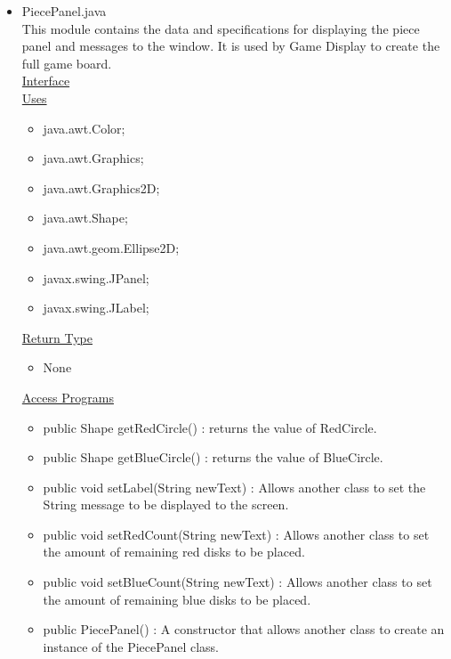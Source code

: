 \documentclass[12pt]{article}
\begin{document}
\begin{itemize}
\begin{itemize}
		\end{itemize}
			\item PiecePanel.java \\
			This module contains the data and specifications for displaying the piece panel and messages to the window. It is used by Game Display to create the full game board. \\
			\underline{Interface} \\
			\underline{Uses}
			\begin{itemize}
				\item java.awt.Color;
				\item java.awt.Graphics;
				\item java.awt.Graphics2D;
				\item java.awt.Shape; 
				\item java.awt.geom.Ellipse2D;
				\item javax.swing.JPanel;
				\item javax.swing.JLabel;
			\end{itemize} 
			\underline{Return Type}
			\begin{itemize}
				\item None
			\end{itemize}
			\underline{Access Programs}
			\begin{itemize}
				\item public Shape getRedCircle() : returns the value of RedCircle.
				\item public Shape getBlueCircle() : returns the value of BlueCircle.
				\item public void setLabel(String newText) : Allows another class to set the String message to be displayed to the screen.
				\item public void setRedCount(String newText) : Allows another class to set the amount of remaining red disks to be placed.
				\item public void setBlueCount(String newText) : Allows another class to set the amount of remaining blue disks to be placed.
				\item public PiecePanel() : A constructor that allows another class to create an instance of the PiecePanel class.
				
			\end{itemize}
	\end{itemize}
		
\end{document}
